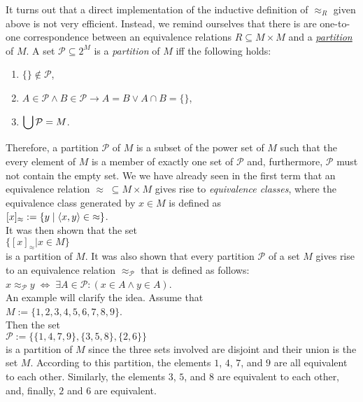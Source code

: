 It turns out that a direct implementation of the inductive definition of $\approx_R$ given above is
not very efficient.  Instead, we remind ourselves that there is are one-to-one correspondence
between an equivalence relations $R \subseteq M \times M$ and a
\href{https://en.wikipedia.org/wiki/Partition_of_a_set}{\emph{partition}} of $M$.  A set 
$\mathcal{P} \subseteq 2^M$ is a \emph{partition} of $M$ iff the following holds:
\begin{enumerate}
\item $\{\} \not\in \mathcal{P}$,
\item $A \in \mathcal{P} \wedge B \in \mathcal{P} \rightarrow A = B \vee A \cap B = \{\}$,
\item $\displaystyle\bigcup \mathcal{P} = M$.
\end{enumerate}
Therefore, a partition $\mathcal{P}$ of $M$ is a subset of the power set of $M$ such that the
every element of $M$ is a member of exactly one set of $\mathcal{P}$ and, furthermore, $\mathcal{P}$ must not contain the
empty set.  We we have already seen in the first term that an equivalence relation 
$\approx \;\subseteq M \times M$ gives rise to \emph{equivalence classes}, where the equivalence class
generated by $x \in M$ is defined as
\\[0.2cm]
\hspace*{1.3cm}
$[x]_\approx := \{ y \mid \pair(x, y) \in\; \approx \}$.
\\[0.2cm]
It was then shown that the set 
\\[0.2cm]
\hspace*{1.3cm}
$\bigl\{ [x]_\approx \big| x \in M \bigr\}$
\\[0.2cm]
is a partition of $M$.  It was also shown that every partition $\mathcal{P}$ of a set $M$ gives rise
to an equivalence relation $\approx_\mathcal{P}$ that is defined as follows:
\\[0.2cm]
\hspace*{1.3cm}
$x \approx_\mathcal{P} y \;\Longleftrightarrow\; \exists A \in \mathcal{P}:(x \in A \wedge y \in A)$.
\\[0.2cm]
An example will clarify the idea.  Assume that
\\[0.2cm]
\hspace*{1.3cm}
$M := \{ 1,2,3,4,5,6,7,8,9 \}$.
\\[0.2cm]
Then the set 
\\[0.2cm]
\hspace*{1.3cm}
$\mathcal{P} := \bigl\{ \{ 1, 4, 7, 9\}, \{3, 5, 8\}, \{2, 6\} \bigr\}$
\\[0.2cm]
is a partition of $M$ since the three sets involved are disjoint and their union is the set $M$.
According to this partition, the elements $1$, $4$, $7$, and $9$ are all
equivalent to each other.  Similarly, the elements $3$, $5$, and $8$ are equivalent to each other,
and, finally, $2$ and $6$ are equivalent.

